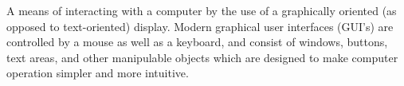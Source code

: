 \item[Graphical User Interface]{
  A means of interacting with a computer by the use of a graphically oriented (as opposed to text-oriented) display. Modern graphical user interfaces (GUI's) are controlled by a mouse as well as a keyboard, and consist of windows, buttons, text areas, and other manipulable objects which are designed to make computer operation simpler and more intuitive.
}
